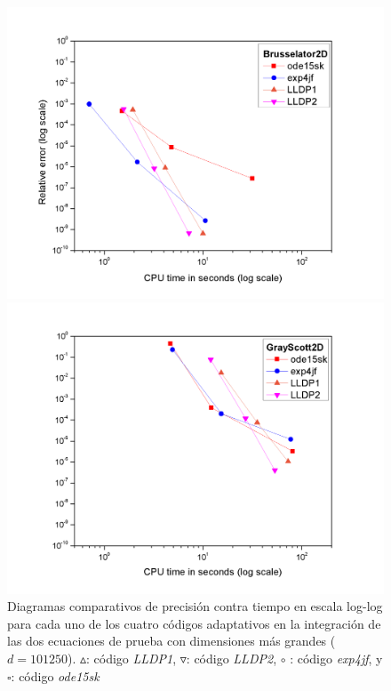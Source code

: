 \begin{figure}
    \centering
    \begin{minipage}{.5\textwidth}
        \hspace{-0.4in}\includegraphics[scale=0.32]{Graphics/Brusselator2D_Larger.png}
    \end{minipage}
    \begin{minipage}{.49\textwidth}
        \hspace{-0.25in}\includegraphics[scale=0.32]{Graphics/GrayScot2D_Larger.png}
    \end{minipage}
    \caption{
        Diagramas comparativos de precisión contra tiempo en escala log-log para cada uno de los cuatro códigos adaptativos en la integración de las dos ecuaciones de prueba con dimensiones más grandes ($d=101 250$). $\vartriangle$: código \emph{LLDP1}, $\triangledown$: código \emph{LLDP2}, $\circ$ : código \emph{exp4jf}, y $\square$: código \emph{ode15sk}}
    \label{Fig2}
\end{figure}


